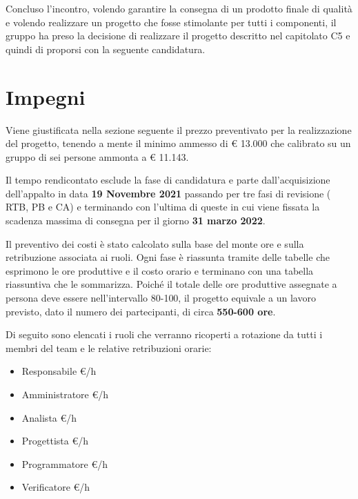 \documentclass{article}
\begin{document}
{\noindent Concluso l'incontro, volendo garantire la consegna di un prodotto finale di qualità e volendo realizzare un progetto che fosse stimolante per tutti i componenti, il gruppo ha preso la decisione di realizzare il progetto descritto nel capitolato C5 e quindi di proporsi con la seguente candidatura.


\section{Impegni}
Viene giustificata nella sezione seguente il prezzo preventivato per la realizzazione del progetto, tenendo a mente il minimo ammesso di € 13.000 che calibrato su un gruppo di sei persone ammonta a € 11.143.\newline

\noindent Il tempo rendicontato esclude la fase di candidatura e parte dall'acquisizione dell’appalto in data \textbf{19 Novembre 2021} passando per tre fasi di revisione ( RTB, PB e CA) e terminando con l'ultima di queste in cui viene fissata la scadenza massima di consegna per il giorno \textbf{31 marzo 2022}.\newline 

\noindent Il preventivo dei costi è stato calcolato sulla base del monte ore e sulla retribuzione associata ai ruoli. \newline Ogni fase è riassunta tramite delle tabelle che esprimono le ore produttive e il costo orario e terminano con una tabella riassuntiva che le sommarizza.
Poiché il totale delle ore produttive assegnate a persona deve essere nell’intervallo 80-100, il progetto equivale a un lavoro previsto, dato il numero dei partecipanti, di circa \textbf{550-600 ore}.\newline

\noindent Di seguito sono elencati i ruoli che verranno ricoperti a rotazione da tutti i membri del team e le relative retribuzioni orarie:
\begin{itemize}
    \item Responsabile €/h
    \item Amministratore €/h
    \item Analista €/h
    \item Progettista €/h
    \item Programmatore €/h
    \item Verificatore €/h
\end{itemize}

}
\end{document}
